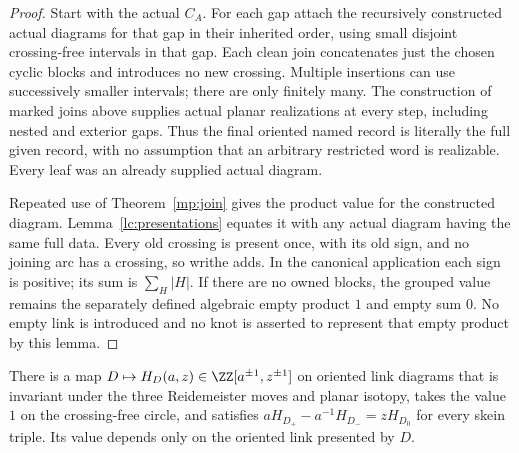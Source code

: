 \begin{proof}
Start with the actual $C_A$. For each gap attach the recursively
constructed actual diagrams for that gap in their inherited order,
using small disjoint crossing-free intervals in that gap. Each clean
join concatenates just the chosen cyclic blocks and introduces no new
crossing. Multiple insertions can use successively smaller intervals;
there are only finitely many. The construction of marked joins above
supplies actual planar realizations at every step, including nested
and exterior gaps. Thus the final oriented named record is literally
the full given record, with no assumption that an arbitrary restricted
word is realizable. Every leaf was an already supplied actual diagram.

Repeated use of Theorem~\ref{mp:join} gives the product value for the
constructed diagram. Lemma~\ref{lc:presentations} equates it with any actual
diagram having the same full data. Every old crossing is present once,
with its old sign, and no joining arc has a crossing, so writhe adds.
In the canonical application each sign is positive; its sum is
$\sum_H|H|$. If there are no owned blocks, the grouped value remains
the separately defined algebraic empty product $1$ and empty sum $0$.
No empty link is introduced and no knot is asserted to represent that
empty product by this lemma.
\end{proof}

\begin{literature}\label{lit:homfly}\leanok
There is a map $D\mapsto H_D(a,z)\in\ZZ[a^{\pm1},z^{\pm1}]$ on oriented
link diagrams that is invariant under the three Reidemeister moves and planar
isotopy, takes the value $1$ on the crossing-free circle, and satisfies
$aH_{D_+}-a^{-1}H_{D_-}=zH_{D_0}$ for every skein triple. Its value depends
only on the oriented link presented by $D$.

\end{literature}

